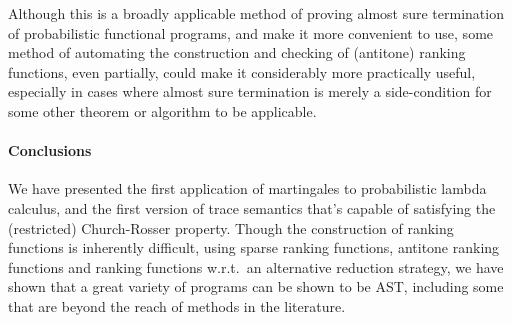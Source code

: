 Although this is a broadly applicable method of proving almost sure termination of probabilistic functional programs, and  make it more convenient to use, some method of automating the construction and checking of (antitone) ranking functions, even partially, could make it considerably more practically useful, especially in cases where almost sure termination is merely a side-condition for some other theorem or algorithm to be applicable.

\paragraph*{Conclusions}

We have presented the first application of martingales to probabilistic lambda calculus, and the first version of trace semantics that's capable of satisfying the (restricted) Church-Rosser property.
Though the construction of ranking functions is inherently difficult, using sparse ranking functions, antitone ranking functions and ranking functions w.r.t.~an alternative reduction strategy, we have shown that a great variety of programs can be shown to be AST, including some that are beyond the reach of methods in the literature.

